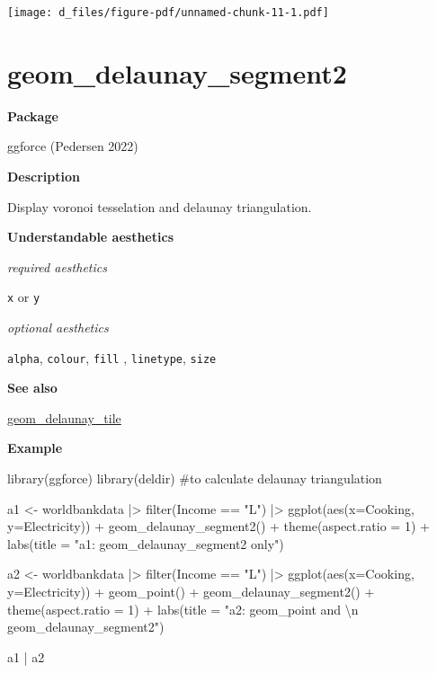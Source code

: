 \documentclass[
  letterpaper,
  DIV=11,
  numbers=noendperiod]{scrreprt}
\newenvironment{Shaded}{\begin{snugshade}}{\end{snugshade}}
\newcommand{\AttributeTok}[1]{\textcolor[rgb]{0.40,0.45,0.13}{#1}}
\newcommand{\CommentTok}[1]{\textcolor[rgb]{0.37,0.37,0.37}{#1}}
\newcommand{\DecValTok}[1]{\textcolor[rgb]{0.68,0.00,0.00}{#1}}
\newcommand{\FunctionTok}[1]{\textcolor[rgb]{0.28,0.35,0.67}{#1}}
\newcommand{\NormalTok}[1]{\textcolor[rgb]{0.00,0.23,0.31}{#1}}
\newcommand{\OtherTok}[1]{\textcolor[rgb]{0.00,0.23,0.31}{#1}}
\newcommand{\SpecialCharTok}[1]{\textcolor[rgb]{0.37,0.37,0.37}{#1}}
\newcommand{\StringTok}[1]{\textcolor[rgb]{0.13,0.47,0.30}{#1}}
\begin{document}
\texttt{[image: d\_files/figure-pdf/unnamed-chunk-11-1.pdf]}

\section{geom\_delaunay\_segment2}\label{delaunay_segment2}

\textbf{Package}

ggforce (Pedersen 2022)

\textbf{Description}

Display voronoi tesselation and delaunay triangulation.

\textbf{Understandable aesthetics}

\emph{required aesthetics}

\texttt{x} or \texttt{y}

\emph{optional aesthetics}

\texttt{alpha}, \texttt{colour}, \texttt{fill} , \texttt{linetype},
\texttt{size}

\textbf{See also}

\hyperref[delaunay_tile]{geom\_delaunay\_tile}

\textbf{Example}

\begin{Shaded}
\begin{Highlighting}[]
\FunctionTok{library}\NormalTok{(ggforce)}
\FunctionTok{library}\NormalTok{(deldir) }\CommentTok{\#to calculate delaunay triangulation}

\NormalTok{a1 }\OtherTok{\textless{}{-}}\NormalTok{ worldbankdata }\SpecialCharTok{|\textgreater{}}
  \FunctionTok{filter}\NormalTok{(Income }\SpecialCharTok{==} \StringTok{"L"}\NormalTok{) }\SpecialCharTok{|\textgreater{}}
  \FunctionTok{ggplot}\NormalTok{(}\FunctionTok{aes}\NormalTok{(}\AttributeTok{x=}\NormalTok{Cooking, }\AttributeTok{y=}\NormalTok{Electricity)) }\SpecialCharTok{+}   
  \FunctionTok{geom\_delaunay\_segment2}\NormalTok{() }\SpecialCharTok{+} 
  \FunctionTok{theme}\NormalTok{(}\AttributeTok{aspect.ratio =} \DecValTok{1}\NormalTok{) }\SpecialCharTok{+}
  \FunctionTok{labs}\NormalTok{(}\AttributeTok{title =} \StringTok{"a1: geom\_delaunay\_segment2 only"}\NormalTok{) }

\NormalTok{a2 }\OtherTok{\textless{}{-}}\NormalTok{ worldbankdata }\SpecialCharTok{|\textgreater{}}
  \FunctionTok{filter}\NormalTok{(Income }\SpecialCharTok{==} \StringTok{"L"}\NormalTok{) }\SpecialCharTok{|\textgreater{}}
  \FunctionTok{ggplot}\NormalTok{(}\FunctionTok{aes}\NormalTok{(}\AttributeTok{x=}\NormalTok{Cooking, }\AttributeTok{y=}\NormalTok{Electricity)) }\SpecialCharTok{+}   
  \FunctionTok{geom\_point}\NormalTok{() }\SpecialCharTok{+}
  \FunctionTok{geom\_delaunay\_segment2}\NormalTok{() }\SpecialCharTok{+} 
  \FunctionTok{theme}\NormalTok{(}\AttributeTok{aspect.ratio =} \DecValTok{1}\NormalTok{) }\SpecialCharTok{+}
  \FunctionTok{labs}\NormalTok{(}\AttributeTok{title =} \StringTok{"a2: geom\_point and }\SpecialCharTok{\textbackslash{}n}\StringTok{ geom\_delaunay\_segment2"}\NormalTok{) }

\NormalTok{a1 }\SpecialCharTok{|}\NormalTok{ a2}
\end{Highlighting}
\end{Shaded}
\end{document}
